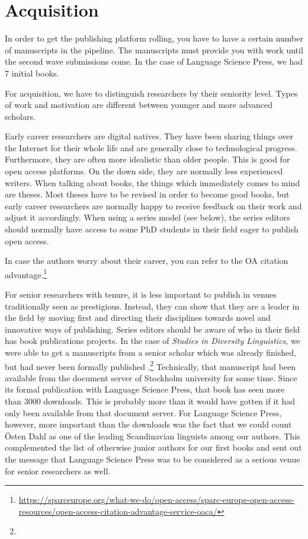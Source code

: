 \documentclass[nonflat,modfonts,output=book] {langsci/langscibook}
\begin{document}
\section{Acquisition}\label{sec:acquisition}
In order to get the publishing platform rolling, you have to have a certain number of manuscripts in the pipeline. The manuscripts must provide you with work until the second wave submissions come. In the case of Language Science Press, we had 7  initial books. 

For acquisition, we have to distinguish researchers by their seniority level. Types of work and motivation are different between younger and more advanced scholars.

Early career researchers are digital natives. They have been sharing things over the Internet for their whole life and are generally close to technological progress. Furthermore, they are often more idealistic than older people. This is good for open access platforms. On the down side, they are normally less experienced writers. When talking about books, the things which immediately comes to mind are theses. Most theses have to be revised in order to become good books, but early career researchers are normally happy to receive feedback on their work and adjust it accordingly. When using a series model (see below), the series editors should normally have access to some PhD students in their field eager to publish open access. 

In case the authors worry about their career, you can refer to the OA citation advantage.\footnote{\url{https://sparceurope.org/what-we-do/open-access/sparc-europe-open-access-resources/open-access-citation-advantage-service-oaca/}}

For senior researchers with tenure, it is less important to publish in venues traditionally seen as prestigious. Instead, they can show that they are a leader in the field by moving first and directing their disciplines towards novel and innovative ways of publishing. 
Series editors should be aware of who in their field has book publications projects. In the case of \textit{Studies in Diversity Linguistics}, we were able to get a manuscripts from a senior scholar which was already finished, but had never been formally published \citep{Dahl2016}.\footnote{} Technically, that manuscript had been available from the document server of Stockholm university for some time. Since its formal publication with Language Science Press, that book has seen more than 3000 downloads. This is probably more than it would have gotten if it had only been available from that document server. For Language Science Press, however, more important than the downloads  was the fact that we could count Östen Dahl as one of the leading Scandinavian linguists among our authors. This complemented the list of otherwise junior authors for our first books and sent out the message that Language Science Press was to be considered as a serious venue for senior researchers as well. 
\end{document}
